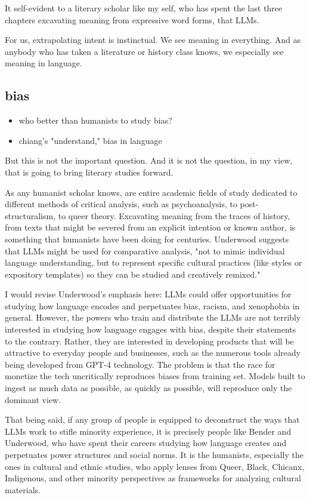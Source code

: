 \documentclass[11pt]{article}
\begin{document}
It self-evident to a literary scholar like my self, who has spent the
last three chapters excavating meaning from expressive word forms,
that LLMs.




For us, extrapolating intent is instinctual. We see meaning in
everything. And as anybody who has taken a literature or history class
knows, we especially see meaning in language. 

\subsection{bias}
\label{sec:org0f8d874}
\begin{itemize}
\item who better than humanists to study bias?
\item chiang's "understand," bias in language
\end{itemize}

But this is not the important question. And it is not the question, in
my view, that is going to bring literary studies forward. 

As any humanist scholar knows, are entire academic fields of study
dedicated to different methods of critical analysis, such as
psychoanalysis, to post-structuralism, to queer theory. Excavating
meaning from the traces of history, from texts that might be severed
from an explicit intention or known author, is something that
humanists have been doing for centuries. Underwood suggests that LLMs
might be used for comparative analysis, "not to mimic individual
language understanding, but to represent specific cultural practices
(like styles or expository templates) so they can be studied and
creatively remixed."

I would revise Underwood’s emphasis here: LLMs could offer
opportunities for studying how language encodes and perpetuates bias,
racism, and xenophobia in general. However, the powers who train and
distribute the LLMs are not terribly interested in studying how
language engages with bias, despite their statements to the
contrary. Rather, they are interested in developing products that will
be attractive to everyday people and businesses, such as the numerous
tools already being developed from GPT-4 technology. The problem is
that the race for monetize the tech uncritically reproduces biases
from training set. Models built to ingest as much data as possible, as
quickly as possible, will reproduce only the dominant view.

That being said, if any group of people is equipped to deconstruct the
ways that LLMs work to stifle minority experience, it is precisely
people like Bender and Underwood, who have spent their careers
studying how language creates and perpetuates power structures and
social norms. It is the humanists, especially the ones in cultural and
ethnic studies, who apply lenses from Queer, Black, Chicanx,
Indigenous, and other minority perspectives as frameworks for
analyzing cultural materials.
\end{document}
